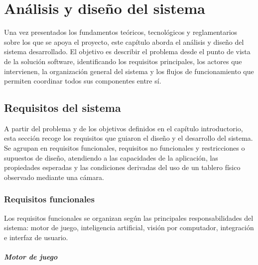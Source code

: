 \chapter{Análisis y diseño del sistema}
\label{chap:analisis-diseno-sistema}

Una vez presentados los fundamentos teóricos, tecnológicos y reglamentarios sobre los que se apoya el proyecto, este capítulo aborda el análisis y diseño del sistema desarrollado. El objetivo es describir el problema desde el punto de vista de la solución software, identificando los requisitos principales, los actores que intervienen, la organización general del sistema y los flujos de funcionamiento que permiten coordinar todos sus componentes entre sí.


\section{Requisitos del sistema}
\label{sec:requisitos-sistema}

A partir del problema y de los objetivos definidos en el capítulo introductorio, esta sección recoge los requisitos que guiaron el diseño y el desarrollo del sistema. Se agrupan en requisitos funcionales, requisitos no funcionales y restricciones o supuestos de diseño, atendiendo a las capacidades de la aplicación, las propiedades esperadas y las condiciones derivadas del uso de un tablero físico observado mediante una cámara.


\subsection{Requisitos funcionales}

Los requisitos funcionales se organizan según las principales responsabilidades del sistema: motor de juego, inteligencia artificial, visión por computador, integración e interfaz de usuario.

\paragraph{Motor de juego}

